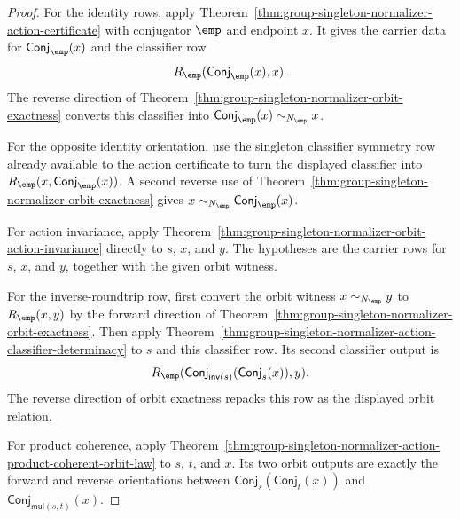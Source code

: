\begin{proof}
For the identity rows, apply
Theorem~\ref{thm:group-singleton-normalizer-action-certificate} with
conjugator $\emp$ and endpoint $x$. It gives the carrier data for
$\mathsf{Conj}_{\emp}(x)$ and the classifier row
$$
R_{\emp}(\mathsf{Conj}_{\emp}(x),x).
$$
The reverse direction of
Theorem~\ref{thm:group-singleton-normalizer-orbit-exactness} converts this
classifier into
$\mathsf{Conj}_{\emp}(x)\sim_{N_{\emp}}x$.

For the opposite identity orientation, use the singleton classifier symmetry
row already available to the action certificate to turn the displayed
classifier into $R_{\emp}(x,\mathsf{Conj}_{\emp}(x))$. A second reverse use of
Theorem~\ref{thm:group-singleton-normalizer-orbit-exactness} gives
$x\sim_{N_{\emp}}\mathsf{Conj}_{\emp}(x)$.

For action invariance, apply
Theorem~\ref{thm:group-singleton-normalizer-orbit-action-invariance} directly
to $s$, $x$, and $y$. The hypotheses are the carrier rows for $s$, $x$, and
$y$, together with the given orbit witness.

For the inverse-roundtrip row, first convert the orbit witness
$x\sim_{N_{\emp}}y$ to $R_{\emp}(x,y)$ by the forward direction of
Theorem~\ref{thm:group-singleton-normalizer-orbit-exactness}. Then apply
Theorem~\ref{thm:group-singleton-normalizer-action-classifier-determinacy} to
$s$ and this classifier row. Its second classifier output is
$$
R_{\emp}(\mathsf{Conj}_{\mathsf{inv}(s)}(\mathsf{Conj}_s(x)),y).
$$
The reverse direction of orbit exactness repacks this row as the displayed
orbit relation.

For product coherence, apply
Theorem~\ref{thm:group-singleton-normalizer-action-product-coherent-orbit-law}
to $s$, $t$, and $x$. Its two orbit outputs are exactly the forward and reverse
orientations between
$\mathsf{Conj}_s(\mathsf{Conj}_t(x))$ and
$\mathsf{Conj}_{\mathsf{mul}(s,t)}(x)$.
\end{proof}
